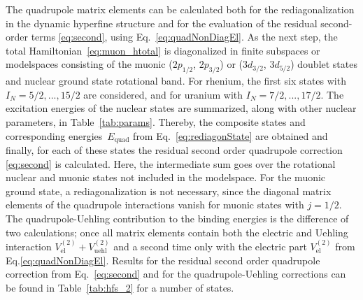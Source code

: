 The quadrupole matrix elements can be calculated both for the rediagonalization in the dynamic hyperfine structure and for the evaluation of the residual second-order terms \eqref{eq:second}, using Eq.~\eqref{eq:quadNonDiagEl}. As the next step, the total Hamiltonian~\eqref{eq:muon_htotal} is diagonalized in finite subspaces or modelspaces consisting of the muonic ($2p_{1/2}$, $2p_{3/2}$) or ($3d_{3/2}$, $3d_{5/2}$) doublet states and nuclear ground state rotational band. For rhenium, the first six states with $I_N =5/2,...,15/2$ are considered, and for uranium with $I_N =7/2,...,17/2$. The excitation energies of the nuclear states are summarized, along with other nuclear parameters, in Table~\ref{tab:params}. Thereby, the composite states and corresponding energies~$E_{\text{quad}}$ from Eq.~\eqref{eq:rediagonState} are obtained and finally, for each of these states the residual second order quadrupole correction \eqref{eq:second} is calculated. Here, the intermediate sum goes over the rotational nuclear and muonic states not included in the modelspace.
For the muonic ground state, a rediagonalization is not necessary, since the diagonal matrix elements of the quadrupole interactions vanish for muonic states with $j=1/2$.
The quadrupole-Uehling contribution to the binding energies is the difference of two calculations; once all matrix elements contain both the electric and Uehling interaction ${V_{\text{el}}^{(2)}}{+}{V_{\text{uehl}}^{(2)}}$ and a second time only with the electric part ${V_{\text{el}}^{(2)}}$ from Eq.\eqref{eq:quadNonDiagEl}. Results for the residual second order quadrupole correction from Eq.~\eqref{eq:second} and for the quadrupole-Uehling corrections can be found in Table~\ref{tab:hfs_2} for a number of states.\\

